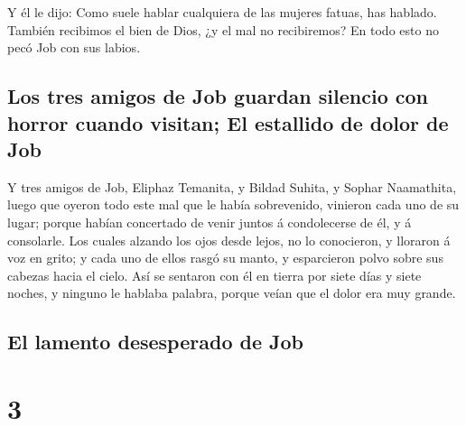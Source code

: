  Y él le dijo: Como suele hablar cualquiera de las
mujeres fatuas, has hablado. También recibimos el bien de Dios, ¿y el
mal no recibiremos? En todo esto no pecó Job con sus labios.

\hypertarget{los-tres-amigos-de-job-guardan-silencio-con-horror-cuando-visitan-el-estallido-de-dolor-de-job}{%
\subsection{Los tres amigos de Job guardan silencio con horror cuando
visitan; El estallido de dolor de
Job}\label{los-tres-amigos-de-job-guardan-silencio-con-horror-cuando-visitan-el-estallido-de-dolor-de-job}}

 Y tres amigos de Job, Eliphaz Temanita, y Bildad Suhita,
y Sophar Naamathita, luego que oyeron todo este mal que le había
sobrevenido, vinieron cada uno de su lugar; porque habían concertado de
venir juntos á condolecerse de él, y á consolarle.  Los
cuales alzando los ojos desde lejos, no lo conocieron, y lloraron á voz
en grito; y cada uno de ellos rasgó su manto, y esparcieron polvo sobre
sus cabezas hacia el cielo.  Así se sentaron con él en
tierra por siete días y siete noches, y ninguno le hablaba palabra,
porque veían que el dolor era muy grande.

\hypertarget{el-lamento-desesperado-de-job}{%
\subsection{El lamento desesperado de
Job}\label{el-lamento-desesperado-de-job}}

\hypertarget{section-18-3}{%
\section{3}\label{section-18-3}}

